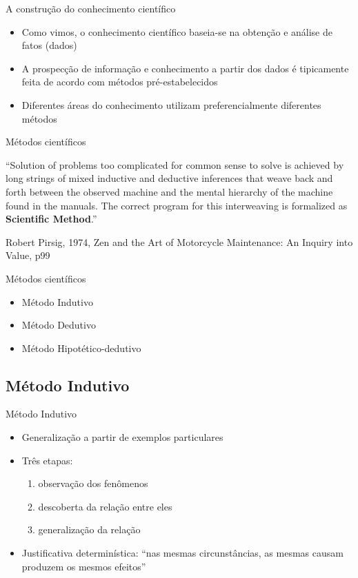 \documentclass{beamer}
\begin{document}
\begin{frame}{A construção do conhecimento científico}
  \begin{itemize}
  \item Como vimos, o conhecimento científico baseia-se na obtenção e
    análise de fatos (dados)
  \item A prospecção de informação e conhecimento a partir dos dados é
    tipicamente feita de acordo com métodos pré-estabelecidos
  \item Diferentes áreas do conhecimento utilizam preferencialmente
    diferentes métodos
  \end{itemize}
\end{frame}

\begin{frame}{Métodos científicos}
  \begin{block}{}
    ``Solution of problems too complicated for common sense to solve
    is achieved by long strings of mixed \alert{inductive} and
    \alert{deductive} inferences that weave back and forth between the
    observed machine and the mental hierarchy of the machine found in
    the manuals. The correct program for this interweaving is
    formalized as {\bf Scientific Method}.''

    Robert Pirsig, 1974, Zen and the Art of Motorcycle Maintenance: An
    Inquiry into Value, p99
  \end{block}
\end{frame}

\begin{frame}{Métodos científicos}
  \begin{itemize}
  \item Método Indutivo
  \item Método Dedutivo
  \item Método Hipotético-dedutivo
  \end{itemize}
\end{frame}

\subsection{Método Indutivo}

\begin{frame}{Método Indutivo}
  \begin{itemize}
  \item \alert<1>{Generalização} a partir de exemplos particulares
  \item Três etapas:
    \begin{enumerate}
    \item observação dos fenômenos
    \item descoberta da relação entre eles
    \item generalização da relação
    \end{enumerate}
  \item Justificativa determinística: ``nas mesmas circunstâncias, as
    mesmas causam produzem os mesmos efeitos''
  \end{itemize}
\end{frame}
\end{document}
